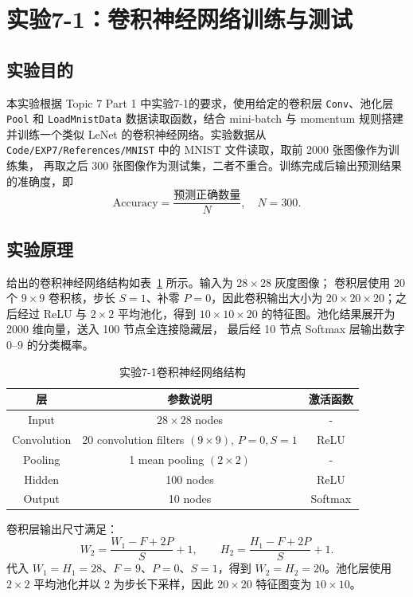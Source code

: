 \documentclass[10.5pt]{config}
\begin{document}
\clearpage

\section{实验7-1：卷积神经网络训练与测试}

\subsection{实验目的}

本实验根据 Topic 7 Part 1 中实验7-1的要求，使用给定的卷积层 \texttt{Conv}、池化层
\texttt{Pool} 和 \texttt{LoadMnistData} 数据读取函数，结合 mini-batch 与 momentum
规则搭建并训练一个类似 LeNet 的卷积神经网络。实验数据从
\texttt{Code/EXP7/References/MNIST} 中的 MNIST 文件读取，取前 2000 张图像作为训练集，
再取之后 300 张图像作为测试集，二者不重合。训练完成后输出预测结果的准确度，即
\[
\mathrm{Accuracy}=\frac{\text{预测正确数量}}{N},\quad N=300.
\]

\subsection{实验原理}

给出的卷积神经网络结构如表~\ref{tab:exp71_net} 所示。输入为 $28\times28$ 灰度图像；
卷积层使用 20 个 $9\times9$ 卷积核，步长 $S=1$、补零 $P=0$，因此卷积输出大小为
$20\times20\times20$；之后经过 ReLU 与 $2\times2$ 平均池化，得到
$10\times10\times20$ 的特征图。池化结果展开为 2000 维向量，送入 100 节点全连接隐藏层，
最后经 10 节点 Softmax 层输出数字 $0$--$9$ 的分类概率。

\begin{table}[H]
\centering
\small
\begin{tabular}{ccc}
\toprule
层 & 参数说明 & 激活函数 \\
\midrule
Input & $28\times28$ nodes & - \\
Convolution & 20 convolution filters $(9\times9)$, $P=0,S=1$ & ReLU \\
Pooling & 1 mean pooling $(2\times2)$ & - \\
Hidden & 100 nodes & ReLU \\
Output & 10 nodes & Softmax \\
\bottomrule
\end{tabular}
\caption{实验7-1卷积神经网络结构}
\label{tab:exp71_net}
\end{table}

卷积层输出尺寸满足：
\[
W_2=\frac{W_1-F+2P}{S}+1,\qquad
H_2=\frac{H_1-F+2P}{S}+1.
\]
代入 $W_1=H_1=28$、$F=9$、$P=0$、$S=1$，得到 $W_2=H_2=20$。池化层使用
$2\times2$ 平均池化并以 2 为步长下采样，因此 $20\times20$ 特征图变为
$10\times10$。
\end{document}
